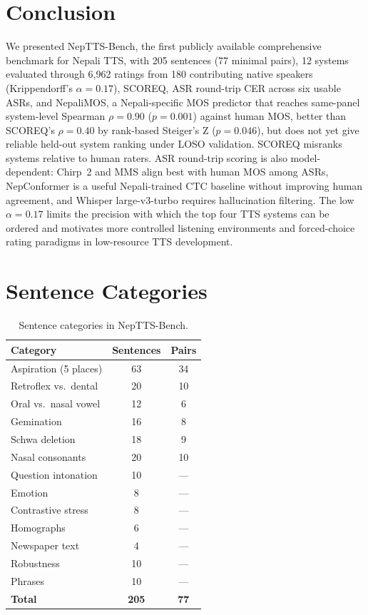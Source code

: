\documentclass[11pt]{article}
\begin{document}
\section{Conclusion}

We presented NepTTS-Bench, the first publicly available comprehensive benchmark for Nepali TTS, with 205 sentences (77 minimal pairs), 12 systems evaluated through 6{,}962 ratings from 180 contributing native speakers (Krippendorff's $\alpha = 0.17$), SCOREQ, ASR round-trip CER across six usable ASRs, and NepaliMOS, a Nepali-specific MOS predictor that reaches same-panel system-level Spearman $\rho = 0.90$ ($p = 0.001$) against human MOS, better than SCOREQ's $\rho = 0.40$ by rank-based Steiger's Z ($p = 0.046$), but does not yet give reliable held-out system ranking under LOSO validation. SCOREQ misranks systems relative to human raters. ASR round-trip scoring is also model-dependent: Chirp~2 and MMS align best with human MOS among ASRs, NepConformer is a useful Nepali-trained CTC baseline without improving human agreement, and Whisper large-v3-turbo requires hallucination filtering. The low $\alpha = 0.17$ limits the precision with which the top four TTS systems can be ordered and motivates more controlled listening environments and forced-choice rating paradigms in low-resource TTS development.




\appendix

\section{Sentence Categories}
\label{appx:categories}

\begin{table}[h]
\centering
\caption{Sentence categories in NepTTS-Bench.}
\begin{tabular}{lcc}
\toprule
Category & Sentences & Pairs \\
\midrule
Aspiration (5 places) & 63 & 34 \\
Retroflex vs.\ dental & 20 & 10 \\
Oral vs.\ nasal vowel & 12 & 6 \\
Gemination & 16 & 8 \\
Schwa deletion & 18 & 9 \\
Nasal consonants & 20 & 10 \\
Question intonation & 10 & --- \\
Emotion & 8 & --- \\
Contrastive stress & 8 & --- \\
Homographs & 6 & --- \\
Newspaper text & 4 & --- \\
Robustness & 10 & --- \\
Phrases & 10 & --- \\
\midrule
\textbf{Total} & \textbf{205} & \textbf{77} \\
\bottomrule
\end{tabular}
\end{table}
\end{document}
